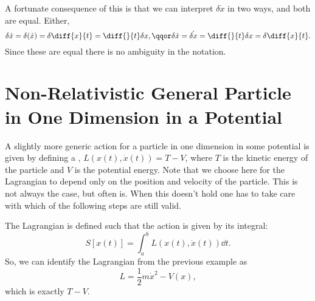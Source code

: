 \documentclass[fleqn]{NotesClass}
\newcommand*{\lagrangian}{L}
\begin{document}
    A fortunate consequence of this is that we can interpret \(\delta \dot{x}\) in two ways, and both are equal.
    Either,
    \begin{equation}
        \delta \dot{x} = \delta (\dot{x}) = \delta \diff{x}{t} = \diff{}{t}\delta x, \qqor \delta \dot{x} = \dot{\delta x} = \diff{}{t} \delta x = \delta \diff{x}{t}.
    \end{equation}
    Since these are equal there is no ambiguity in the notation.
    
    \section[Non-Relativistic General Particle in One Dimension in a Potential][Second Example]{Non-Relativistic General Particle in One Dimension in a Potential}
    A slightly more generic action for a particle in one dimension in some potential is given by defining a , \(\lagrangian(x(t), \dot{x}(t)) = T - V\), where \(T\) is the kinetic energy of the particle and \(V\) is the potential energy.
    Note that we choose here for the Lagrangian to depend only on the position and velocity of the particle.
    This is not always the case, but often is.
    When this doesn't hold one has to take care with which of the following steps are still valid.
    
    The Lagrangian is defined such that the action is given by its integral:
    \begin{equation}
        S[x(t)] = \int_a^b \lagrangian(x(t), \dot{x}(t)) \dd{t}.
    \end{equation}
    So, we can identify the Lagrangian from the previous example as
    \begin{equation}
        \lagrangian = \frac{1}{2}m\dot{x}^2 - V(x),
    \end{equation}
    which is exactly \(T - V\).
    
\end{document}
